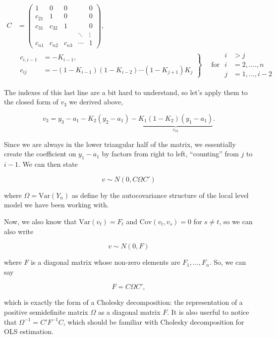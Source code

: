 \documentclass{tufte-book}
\begin{document}
\begin{align*}
C &= \begin{pmatrix}
1 & 0 & 0 & & 0 \\
c_{21} & 1 & 0 && 0 \\
c_{31} & c_{32} & 1 && 0 \\
 & & & \ddots & \vdots \\
c_{n1} & c_{n2} & c_{n3} & \cdots & 1
\end{pmatrix}, \\
&\left. 
    \begin{aligned}
    c_{i, i-1} &= -K_{i-1}, \\
    c_{ij} &= -(1 - K_{i-1})(1 - K_{i-2}) \cdots (1 - K_{j+1}) K_j
    \end{aligned}
\right\} \quad \text{ for } \begin{aligned}
i&>j \\
i &=2, ...., n \\
j &= 1, ..., i-2
\end{aligned}
\end{align*}

The indexes of this last line are a bit hard to understand, so let's apply them to the closed form of $v_3$ we derived above,

\[
v_3 = y_3 - a_1 - K_2 (y_2 - a_1) - \underbrace{K_1(1 - K_2)(y_1 - a_1)}_{c_{31}}.
\]

\noindent Since we are always in the lower triangular half of the matrix, we essentially create the coefficient on $y_1 - a_1$ by factors from right to left, ``counting'' from $j$ to $i - 1$. We can then state

\[
v \sim N(0, C\Omega C')
\]

\noindent where $\Omega = \text{Var}(Y_n)$ as define by the autocovariance structure of the local level model we have been working with.

Now, we also know that $\text{Var}(v_t) = F_t$ and $\text{Cov}(v_t, v_s) = 0$ for $s\neq t$, so we can also write

\[
v \sim N(0, F)
\]

\noindent where $F$ is a diagonal matrix whose non-zero elements are $F_1, ..., F_n$. So, we can say

\[
F = C \Omega C',
\]

\noindent which is exactly the form of a Cholesky decomposition: the representation of a positive semidefinite matrix $\Omega$ as a diagonal matrix $F$. It is also userful to notice that $\Omega^{-1} = C' F^{-1} C$, which should be familiar with Cholesky decomposition for OLS estimation.
\end{document}
